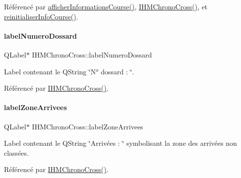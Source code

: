 Référencé par \hyperlink{class_i_h_m_chrono_cross_afe18e84e4df15c15921f2bdcfc6f4396}{afficher\+Informations\+Course()}, \hyperlink{class_i_h_m_chrono_cross_a479fc90733fba3e65fb06aa4a3adc02e}{I\+H\+M\+Chrono\+Cross()}, et \hyperlink{class_i_h_m_chrono_cross_a1149f4f57c8cf34048f93fba6b4176b3}{reinitialiser\+Info\+Course()}.

\mbox{\label{class_i_h_m_chrono_cross_a73afea901ae4b6eb4c0d136818ed1fa6}} 
\paragraph{\texorpdfstring{label\+Numero\+Dossard}{labelNumeroDossard}}
{\footnotesize\ttfamily Q\+Label$\ast$ I\+H\+M\+Chrono\+Cross\+::label\+Numero\+Dossard\hspace{0.3cm}{\ttfamily [private]}}



Label contenant le Q\+String \char`\"{}\+N° dossard \+: \char`\"{}. 



Référencé par \hyperlink{class_i_h_m_chrono_cross_a479fc90733fba3e65fb06aa4a3adc02e}{I\+H\+M\+Chrono\+Cross()}.

\mbox{\label{class_i_h_m_chrono_cross_a56f6c02a8d3274c4359f12709cefa5d2}} 
\paragraph{\texorpdfstring{label\+Zone\+Arrivees}{labelZoneArrivees}}
{\footnotesize\ttfamily Q\+Label$\ast$ I\+H\+M\+Chrono\+Cross\+::label\+Zone\+Arrivees\hspace{0.3cm}{\ttfamily [private]}}



Label contenant le Q\+String \char`\"{}\+Arrivées \+: \char`\"{} symbolisant la zone des arrivées non classées. 



Référencé par \hyperlink{class_i_h_m_chrono_cross_a479fc90733fba3e65fb06aa4a3adc02e}{I\+H\+M\+Chrono\+Cross()}.

